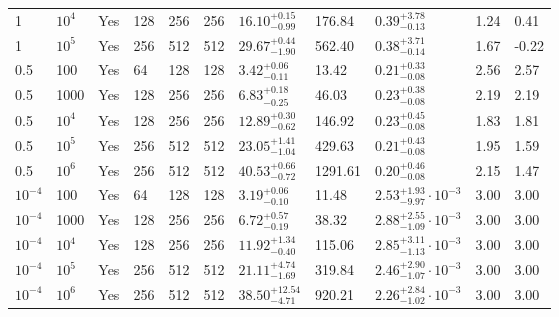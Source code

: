 \documentclass[aps, prfluids, onecolumn, notitlepage, nofootinbib, groupedaddress, amsfonts, amssymb, amsmath]{revtex4-1}
\begin{document}
\begin{center}
\begin{longtable}{ p{1cm} p{1cm} p{1cm} p{1cm} p{1cm} p{1cm} p{1.75cm} p{1.5cm} p{2.75cm} p{1cm} p{1.2cm}  }
\vspace{0.08cm}1	&	$10^4$	&	Yes	&	128	&	256	&	256	&$	16.10	_{-	0.99	}^{+	0.15	}$&	176.84	&$	0.39	_{-	0.13	}^{+	3.78	}$&	1.24	&	0.41	\\
\vspace{0.08cm}1	&	$10^5$	&	Yes	&	256	&	512	&	512	&$	29.67	_{-	1.90	}^{+	0.44	}$&	562.40	&$	0.38	_{-	0.14	}^{+	3.71	}$&	1.67	&	-0.22	\\
\vspace{0.08cm}0.5	&	100	&	Yes	&	64	&	128	&	128	&$	3.42	_{-	0.11	}^{+	0.06	}$&	13.42	&$	0.21	_{-	0.08	}^{+	0.33	}$&	2.56	&	2.57	\\
\vspace{0.08cm}0.5	&	1000	&	Yes	&	128	&	256	&	256	&$	6.83	_{-	0.25	}^{+	0.18	}$&	46.03	&$	0.23	_{-	0.08	}^{+	0.38	}$&	2.19	&	2.19	\\
\vspace{0.08cm}0.5	&	$10^4$	&	Yes	&	128	&	256	&	256	&$	12.89	_{-	0.62	}^{+	0.30	}$&	146.92	&$	0.23	_{-	0.08	}^{+	0.45	}$&	1.83	&	1.81	\\
\vspace{0.08cm}0.5	&	$10^5$	&	Yes	&	256	&	512	&	512	&$	23.05	_{-	1.04	}^{+	1.41	}$&	429.63	&$	0.21	_{-	0.08	}^{+	0.43	}$&	1.95	&	1.59	\\
\vspace{0.08cm}0.5	&	$10^6$	&	Yes	&	256	&	512	&	512	&$	40.53	_{-	0.72	}^{+	0.66	}$&	1291.61	&$	0.20	_{-	0.08	}^{+	0.46	}$&	2.15	&	1.47	\\
\vspace{0.08cm}$10^{-4}$	&	100	&	Yes	&	64	&	128	&	128	&$	3.19	_{-	0.10	}^{+	0.06	}$&	11.48	&$	2.53	_{-	9.97	}^{+	1.93}\cdot 10^{-3}	$&	3.00	&	3.00	\\
\vspace{0.08cm}$10^{-4}$	&	1000	&	Yes	&	128	&	256	&	256	&$	6.72	_{-	0.19	}^{+	0.57	}$&	38.32	&$	2.88	_{-	1.09	}^{+	2.55}\cdot 10^{-3}	$&	3.00	&	3.00	\\
\vspace{0.08cm}$10^{-4}$	&	$10^4$	&	Yes	&	128	&	256	&	256	&$	11.92	_{-	0.40	}^{+	1.34	}$&	115.06	&$	2.85	_{-	1.13	}^{+	3.11}\cdot 10^{-3}	$&	3.00	&	3.00	\\
\vspace{0.08cm}$10^{-4}$	&	$10^5$	&	Yes	&	256	&	512	&	512	&$	21.11	_{-	1.69	}^{+	4.74	}$&	319.84	&$	2.46	_{-	1.07	}^{+	2.90}\cdot 10^{-3}	$&	3.00	&	3.00	\\
\vspace{0.08cm}$10^{-4}$	&	$10^6$	&	Yes	&	256	&	512	&	512	&$	38.50	_{-	4.71	}^{+	12.54	}$&	920.21	&$	2.26	_{-	1.02	}^{+	2.84}\cdot 10^{-3}	$&	3.00	&	3.00	\\
\hline
\end{longtable}
\end{center}
\end{document}
